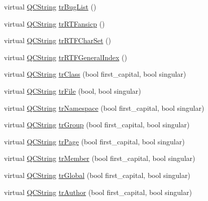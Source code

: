 \begin{DoxyCompactItemize}
\item 
virtual \mbox{\hyperlink{class_q_c_string}{Q\+C\+String}} \mbox{\hyperlink{class_translator_persian_aa14e866e1bf12f10fe27e2a9037810d0}{tr\+Bug\+List}} ()
\item 
virtual \mbox{\hyperlink{class_q_c_string}{Q\+C\+String}} \mbox{\hyperlink{class_translator_persian_a726bd8cac1d4e5623e5538b522c1bf31}{tr\+R\+T\+Fansicp}} ()
\item 
virtual \mbox{\hyperlink{class_q_c_string}{Q\+C\+String}} \mbox{\hyperlink{class_translator_persian_a25e7ec74ce148545edb8fc74c098c7b9}{tr\+R\+T\+F\+Char\+Set}} ()
\item 
virtual \mbox{\hyperlink{class_q_c_string}{Q\+C\+String}} \mbox{\hyperlink{class_translator_persian_a554a8ee5a92be3505a476b5288e89de5}{tr\+R\+T\+F\+General\+Index}} ()
\item 
virtual \mbox{\hyperlink{class_q_c_string}{Q\+C\+String}} \mbox{\hyperlink{class_translator_persian_aca05419884ed135f61766579a00bf85c}{tr\+Class}} (bool first\+\_\+capital, bool singular)
\item 
virtual \mbox{\hyperlink{class_q_c_string}{Q\+C\+String}} \mbox{\hyperlink{class_translator_persian_ae1ba6330d764c7b59e269630592b9528}{tr\+File}} (bool, bool singular)
\item 
virtual \mbox{\hyperlink{class_q_c_string}{Q\+C\+String}} \mbox{\hyperlink{class_translator_persian_ab5e3fcb4a155c69efc60839ae578c781}{tr\+Namespace}} (bool first\+\_\+capital, bool singular)
\item 
virtual \mbox{\hyperlink{class_q_c_string}{Q\+C\+String}} \mbox{\hyperlink{class_translator_persian_a3d2da9079a432bb8dc7712df9ec62350}{tr\+Group}} (bool first\+\_\+capital, bool singular)
\item 
virtual \mbox{\hyperlink{class_q_c_string}{Q\+C\+String}} \mbox{\hyperlink{class_translator_persian_a0fce47b79f4f038344490bf3fe82e684}{tr\+Page}} (bool first\+\_\+capital, bool singular)
\item 
virtual \mbox{\hyperlink{class_q_c_string}{Q\+C\+String}} \mbox{\hyperlink{class_translator_persian_af4f8bb66b2100cc0d3d97cd516919a72}{tr\+Member}} (bool first\+\_\+capital, bool singular)
\item 
virtual \mbox{\hyperlink{class_q_c_string}{Q\+C\+String}} \mbox{\hyperlink{class_translator_persian_a2110cb861f7c4e8237c6de68e5df714a}{tr\+Global}} (bool first\+\_\+capital, bool singular)
\item 
virtual \mbox{\hyperlink{class_q_c_string}{Q\+C\+String}} \mbox{\hyperlink{class_translator_persian_a9ae6f695433e6fb8c5bd1838954f5f0f}{tr\+Author}} (bool first\+\_\+capital, bool singular)

\end{DoxyCompactItemize}
